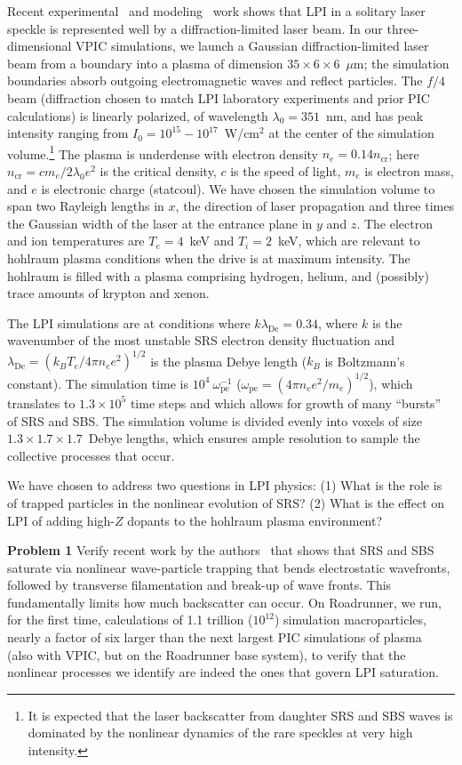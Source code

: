 \documentclass[10pt]{article}
\newcommand{\lde}      {\lambda_{\mathrm{De}}}
\newcommand{\wpe}      {\omega_{\mathrm{pe}}}
\begin{document}
Recent experimental~\cite{Kline_PRL_2005} and modeling~\cite{Yin_et_al_PRL_2007_SRS} work shows that LPI
in a solitary laser speckle is represented well by a
diffraction-limited laser beam.  In our three-dimensional VPIC
simulations, we launch a Gaussian diffraction-limited laser beam from
a boundary into a plasma of dimension $35 \times 6 \times 6$~$\mu$m; 
the simulation boundaries absorb outgoing
electromagnetic waves and reflect particles.  The $f/4$ beam (diffraction
chosen to match LPI laboratory experiments and prior PIC calculations) is
linearly polarized, of wavelength $\lambda_0 = 351$~nm, and has peak
intensity ranging from $I_0 = 10^{15} - 10^{17}$~W/cm$^2$ at the center 
of the simulation volume.\footnote{It is expected that the laser backscatter 
from daughter SRS and SBS waves is dominated by the nonlinear dynamics of 
the rare speckles at very high intensity.}  The plasma is
underdense with electron density $n_e = 0.14 n_{\mathrm{cr}}$; here
$n_{\mathrm{cr}} = c m_e / 2 \lambda_0 e^2$ is the critical
density, $c$ is the speed of light, $m_e$ is electron mass, and $e$ is 
electronic charge (statcoul).
We have chosen the simulation volume to span two Rayleigh lengths in
$x$, the direction of laser propagation and three times the Gaussian
width of the laser at the entrance plane in $y$ and $z$.  The electron 
and ion temperatures are $T_e = 4$~keV and $T_i = 2$~keV, which
are relevant to hohlraum plasma conditions when the drive is at maximum
intensity.  The hohlraum is filled with a plasma comprising hydrogen,
helium, and (possibly) trace amounts of krypton and xenon.

The LPI simulations are at conditions where $k \lde = 0.34$,
where $k$ is the wavenumber of the most unstable SRS electron density
fluctuation and $\lde = (k_B T_e / 4 \pi n_e e^2)^{1/2}$ is the plasma 
Debye length ($k_B$ is Boltzmann's constant).  The simulation
time is $10^4~\wpe^{-1}$ ($\wpe = (4 \pi n_e e^2 / m_e)^{1/2}$), which
translates to $1.3 \times 10^5$ time steps and which allows for
growth of many ``bursts'' of SRS and SBS.  The simulation 
volume is divided evenly
into voxels of size $1.3 \times 1.7 \times 1.7$~Debye lengths,
which ensures ample resolution to sample the collective processes that 
occur. 

We have chosen to address two questions in LPI physics: (1) What is 
the role is of trapped particles in the nonlinear evolution of SRS?  
(2) What is the effect on LPI of adding high-$Z$ dopants to the 
hohlraum plasma environment?

\textbf{Problem 1}
Verify recent work by the authors~\cite{Yin_et_al_PRL_2007_SRS,Yin_et_al_Phys_Plasmas_2007_SRS} that shows that SRS and
SBS saturate via nonlinear wave-particle trapping that bends
electrostatic wavefronts,
followed by transverse filamentation and break-up of wave fronts.  This fundamentally
limits how much backscatter can occur.  On
Roadrunner, we run, for the first time, calculations of 1.1 trillion
($10^{12}$) simulation macroparticles, nearly a factor of six larger
than the next largest PIC simulations of plasma~\cite{Yin_et_al_PRL_2007_reconnection} (also with
VPIC, but on the Roadrunner base system), to verify that the nonlinear 
processes we identify are indeed the ones that govern LPI saturation.
\end{document}
